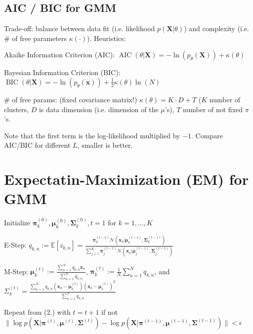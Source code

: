 \documentclass[a4paper, 11pt, landscape]{article}
\begin{document}
\begin{multicols*}{3}
\subsection{AIC / BIC for GMM}
Trade-off: balance between data fit (i.e. likelihood $p(\mathbf{X} | \theta)$) and complexity (i.e. \# of free parameters $\kappa(\cdot)$). Heuristics:
\begin{compactdesc}
	\item[Akaike Information Criterion (AIC):] $\operatorname{AIC}(\theta | \mathbf{X}) = -\ln(p_\theta(\mathbf{X})) + \kappa(\theta)$
	\item[Bayesian Information Criterion (BIC):] $\operatorname{BIC}(\theta | \mathbf{X}) = -\ln(p_\theta(\mathbf{x})) + \frac{1}{2} \kappa(\theta) \ln(N)$
	\item[\# of free params:] (fixed covariance matrix!) $\kappa(\theta) = K \cdot D + T$ ($K$ number of clusters, $D$ is data dimension (i.e. dimension of the $\mu$'s), $T$ number of not fixed $\pi$'s.
\end{compactdesc}
Note that the first term is the log-likelihood multiplied by $-1$. Compare AIC/BIC for different $L$, smaller is better.


\section{Expectatin-Maximization (EM) for GMM}
\begin{compactenum}
	\item Initialize $\boldsymbol{\pi}_k^{(0)}, \boldsymbol{\mu}_k^{(0)}, \boldsymbol{\Sigma}_k^{(0)}, t = 1$ for $k = 1, \ldots, K$
	\item E-Step: $q_{k,n} := \mathbb{E}[z_{k,n}] = \frac{\boldsymbol{\pi}_k^{(t-1)} \mathcal{N}(\mathbf{x}_n | \boldsymbol{\mu}_k^{(t-1)}, \boldsymbol{\Sigma}_k^{(t-1)})}{\sum_{j=1}^K \boldsymbol{\pi}_j^{(t-1)} \mathcal{N}(\mathbf{x}_n | \boldsymbol{\mu}_j^{(t-1)}, \boldsymbol{\Sigma}_j^{(t-1)})}$
	\item M-Step: $\boldsymbol{\mu}_k^{(t)} := \frac{\sum_{n=1}^N q_{k,n} \mathbf{x}_n}{\sum_{n=1}^N q_{k,n}}$, $\boldsymbol{\pi}_k^{(t)} := \frac{1}{N} \sum_{n=1}^N q_{k,n}$, and $\Sigma_k^{(t)} = \frac{\sum_{n=1}^N q_{k, n} (\mathbf{x}_n - \boldsymbol{\mu}_k^{(t)})(\mathbf{x}_k - \boldsymbol{\mu}_k^{(t)})^T}{\sum_{n=1}^N q_{k,n}}$
	\item Repeat from (2.) with $t = t + 1$ if not $\| \log p(\mathbf{X} | \boldsymbol{\pi}^{(t)}, \boldsymbol{\mu}^{(t)}, \boldsymbol{\Sigma}^{(t)}) - \log p(\mathbf{X} | \boldsymbol{\pi}^{(t-1)}, \boldsymbol{\mu}^{(t-1)}, \boldsymbol{\Sigma}^{(t-1)}) \| < \epsilon$
\end{compactenum}



\end{multicols*}
\end{document}
